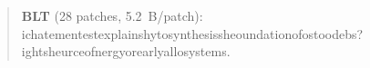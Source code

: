 \begin{quote}
\textbf{BLT} (28 patches, 5.2~B/patch):\\[1pt]
\allowbreak{}\allowbreak{}i\allowbreak{}c\allowbreak{}h\allowbreak{}\textvisiblespace{}\allowbreak{}\allowbreak{}\allowbreak{}a\allowbreak{}t\allowbreak{}e\allowbreak{}m\allowbreak{}e\allowbreak{}n\allowbreak{}t\allowbreak{}\textvisiblespace{}\allowbreak{}\allowbreak{}e\allowbreak{}s\allowbreak{}t\allowbreak{}\textvisiblespace{}\allowbreak{}e\allowbreak{}x\allowbreak{}p\allowbreak{}l\allowbreak{}a\allowbreak{}i\allowbreak{}n\allowbreak{}s\allowbreak{}\textvisiblespace{}\allowbreak{}\allowbreak{}h\allowbreak{}y\allowbreak{}\textvisiblespace{}\allowbreak{}\allowbreak{}\allowbreak{}\allowbreak{}t\allowbreak{}o\allowbreak{}s\allowbreak{}y\allowbreak{}n\allowbreak{}t\allowbreak{}h\allowbreak{}e\allowbreak{}s\allowbreak{}i\allowbreak{}s\allowbreak{}\textvisiblespace{}\allowbreak{}\allowbreak{}s\allowbreak{}\textvisiblespace{}\allowbreak{}\allowbreak{}h\allowbreak{}e\allowbreak{}\textvisiblespace{}\allowbreak{}\allowbreak{}o\allowbreak{}u\allowbreak{}n\allowbreak{}d\allowbreak{}a\allowbreak{}t\allowbreak{}i\allowbreak{}o\allowbreak{}n\allowbreak{}\textvisiblespace{}\allowbreak{}o\allowbreak{}f\allowbreak{}\textvisiblespace{}\allowbreak{}\allowbreak{}o\allowbreak{}s\allowbreak{}t\allowbreak{}\textvisiblespace{}\allowbreak{}\allowbreak{}o\allowbreak{}o\allowbreak{}d\allowbreak{}\textvisiblespace{}\allowbreak{}\allowbreak{}e\allowbreak{}b\allowbreak{}s\allowbreak{}?\allowbreak{}\textvisiblespace{}\allowbreak{}\allowbreak{}\allowbreak{}\allowbreak{}\allowbreak{}i\allowbreak{}g\allowbreak{}h\allowbreak{}t\allowbreak{}\textvisiblespace{}\allowbreak{}\allowbreak{}s\allowbreak{}\textvisiblespace{}\allowbreak{}\allowbreak{}h\allowbreak{}e\allowbreak{}\textvisiblespace{}\allowbreak{}\allowbreak{}\allowbreak{}u\allowbreak{}r\allowbreak{}c\allowbreak{}e\allowbreak{}\textvisiblespace{}\allowbreak{}o\allowbreak{}f\allowbreak{}\textvisiblespace{}\allowbreak{}\allowbreak{}n\allowbreak{}e\allowbreak{}r\allowbreak{}g\allowbreak{}y\allowbreak{}\textvisiblespace{}\allowbreak{}\allowbreak{}o\allowbreak{}r\allowbreak{}\textvisiblespace{}\allowbreak{}\allowbreak{}e\allowbreak{}a\allowbreak{}r\allowbreak{}l\allowbreak{}y\allowbreak{}\textvisiblespace{}\allowbreak{}a\allowbreak{}l\allowbreak{}l\allowbreak{}\textvisiblespace{}\allowbreak{}\allowbreak{}\allowbreak{}o\allowbreak{}s\allowbreak{}y\allowbreak{}s\allowbreak{}t\allowbreak{}e\allowbreak{}m\allowbreak{}s\allowbreak{}.\allowbreak{}\\[6pt]
\end{quote}
